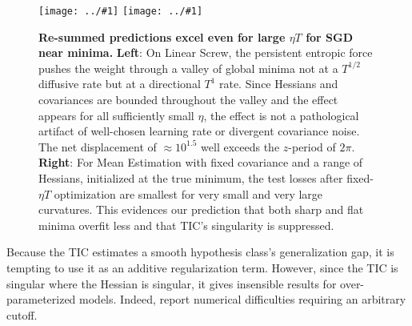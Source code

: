 \documentclass{article}
\theoremstyle{plain}
\theoremstyle{definition}
\newcommand{\plotmoow}[3]{\texttt{[image: ../\#1]}}
\begin{document}
        \begin{figure}[h!] 
            \centering
            \plotmoow{plots/new-thermo-linear-screw}{0.48\columnwidth}{4.0cm}
            \plotmoow{plots/new-tak}{0.48\columnwidth}{4.0cm}
            \caption{
                {\bf Re-summed predictions excel even for large $\eta T$ for
                SGD near minima.}
                {\bf Left}: On Linear Screw, the persistent entropic force
                pushes the weight through a valley of global minima not at a
                $T^{1/2}$ diffusive rate but at a directional $T^1$ rate.
                Since Hessians and covariances are bounded throughout
                the valley and the effect appears for all sufficiently small
                $\eta$, the effect is not a pathological artifact of
                well-chosen learning rate or divergent covariance noise.  The
                net displacement of $\approx 10^{1.5}$ well exceeds the
                $z$-period of $2\pi$. 
                {\bf Right}: For Mean Estimation with fixed covariance and a
                range of Hessians, initialized at the true minimum, the test
                losses after fixed-$\eta T$ optimization are smallest for very
                small and very large curvatures.  This evidences our prediction
                that both sharp and flat minima overfit less and that TIC's
                singularity is suppressed.
            }
            \label{fig:thermoandtak}
        \end{figure}

        Because the TIC estimates a smooth hypothesis class's generalization
        gap, it is tempting to use it as an additive regularization term.
        However, since the TIC is singular where the Hessian is singular, it
        gives insensible results for over-parameterized models.  Indeed,
        \citet{di18} report numerical difficulties requiring an arbitrary
        cutoff. 
\end{document}
